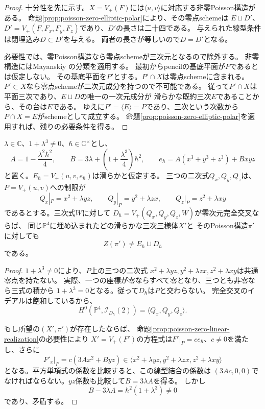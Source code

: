 \begin{proof}
十分性を先に示す。$X=V_+(F)$には$\langle u,v\rangle$に対応する非零Poisson構造がある。
命題\ref{prop:poisson-zero-elliptic-polar}により、その零点schemeは
$E\sqcup D'$、$D'=V_+(F,F_x,F_y,F_z)$であり、$D'$の長さは二十四である。
与えられた線型条件は閉埋込み$D\subset D'$を与える。
両者の長さが等しいので$D=D'$となる。

必要性では、零Poisson構造なら零点schemeが三次元となるので除外する。
非零構造にはMayanskiy \cite[Theorem~1]{Mayanskiy}の分類を適用する。
最初からpencilの基底平面が$P$であるとは仮定しない。
その基底平面を$P'$とする。$P'\cap X$は零点schemeに含まれる。
$P'\subset X$なら零点schemeが二次元成分を持つので不可能である。
従って$P'\cap X$は平面三次であり、$E\sqcup D$の唯一の一次元成分が
滑らかな既約三次$E$であることから、その台は$E$である。
ゆえに$P'=\langle E\rangle=P$であり、三次という次数から$P\cap X=E$がschemeとして成立する。
命題\ref{prop:poisson-zero-elliptic-polar}を適用すれば、残りの必要条件を得る。
\end{proof}

\begin{proposition}[Hesse型データのPoisson零点schemeとしての非実現性]
\label{prop:hesse-point-zero-nonrealization}
$\lambda\in\mathbb C$、$1+\lambda^3\ne0$、$\hbar\in\mathbb C^\times$とし、
\[
 A=1-\frac{\lambda^2\hbar^2}{4},\qquad
 B=3\lambda+\left(1+\frac{\lambda^3}{4}\right)\hbar^2,
 \qquad e_\hbar=A(x^3+y^3+z^3)+Bxyz
\]
と置く。$E_\hbar=V_+(u,v,e_\hbar)$は滑らかと仮定する。
三つの二次式$Q_x,Q_y,Q_z$は、$P=V_+(u,v)$への制限が
\[
 Q_x|_P=x^2+\lambda yz,\qquad
 Q_y|_P=y^2+\lambda zx,\qquad
 Q_z|_P=z^2+\lambda xy
\]
であるとする。三次式$W$に対して
$D_\hbar=V_+(Q_x,Q_y,Q_z,W)$が零次元完全交叉ならば、
同じ$\mathbb P^4$に埋め込まれたどの滑らかな三次三様体$X'$と
そのPoisson構造$\pi'$に対しても
\[
 Z(\pi')\ne E_\hbar\sqcup D_\hbar
\]
である。
\end{proposition}

\begin{proof}
$1+\lambda^3\ne0$により、$P$上の三つの二次式
$x^2+\lambda yz,y^2+\lambda zx,z^2+\lambda xy$は共通零点を持たない。
実際、一つの座標が零ならすべて零となり、三つとも非零なら三式の積から
$1+\lambda^3=0$となる。従って$D_\hbar$は$P$と交わらない。
完全交叉のイデアルは飽和しているから、
\[
 H^0(\mathbb P^4,\mathcal I_{D_\hbar}(2))
 =\langle Q_x,Q_y,Q_z\rangle.
\]

もし所望の$(X',\pi')$が存在したならば、
命題\ref{prop:poisson-zero-linear-realization}の必要性により
$X'=V_+(F')$の方程式は$F'|_P=ce_\hbar$、$c\ne0$を満たし、さらに
\[
 F'_x|_P=c(3Ax^2+Byz)
 \in\langle x^2+\lambda yz,y^2+\lambda zx,z^2+\lambda xy\rangle
\]
となる。平方単項式の係数を比較すると、この線型結合の係数は
$(3Ac,0,0)$でなければならない。$yz$係数も比較して$B=3\lambda A$を得る。
しかし
\[
 B-3\lambda A=\hbar^2(1+\lambda^3)\ne0
\]
であり、矛盾する。
\end{proof}


